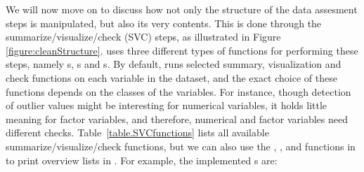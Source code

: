\documentclass[article,shortnames]{jss}
\begin{document}
We will now move on to discuss how not only the structure of the
data assesment steps is manipulated, but also its very contents. This is
done through the summarize/visualize/check (SVC) steps, as illustrated
in Figure \ref{figure:cleanStructure}.   uses three
different types of functions for performing these steps, namely
s, s and
s.  By default,  runs selected summary,
visualization and check functions on each variable in the dataset, and
the exact choice of these functions depends on the classes of the
variables. For instance, though detection of outlier values might be
interesting for numerical variables, it holds little meaning for
factor variables, and therefore, numerical and factor variables need
different checks. Table~\ref{table.SVCfunctions} lists all available
summarize/visualize/check functions, but we can also use the
, , and
 functions in  to print overview
lists in . For example, the implemented
s are:

\end{document}
